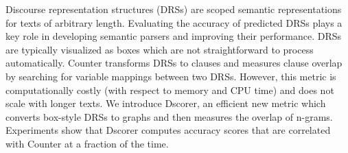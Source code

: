 Discourse representation structures (DRSs) are scoped semantic representations for texts of arbitrary length. Evaluating the accuracy of predicted DRSs plays a key role in developing semantic parsers and improving their performance. DRSs are typically visualized as boxes which are not straightforward to process automatically. Counter transforms DRSs to clauses and measures clause overlap by searching for variable mappings between two DRSs. However, this metric is computationally costly (with respect to memory and CPU time) and does not scale with longer texts. We introduce Dscorer, an efficient new metric which converts box-style DRSs to graphs and then measures the overlap of n-grams. Experiments show that Dscorer computes accuracy scores that are correlated with Counter at a fraction of the time.
